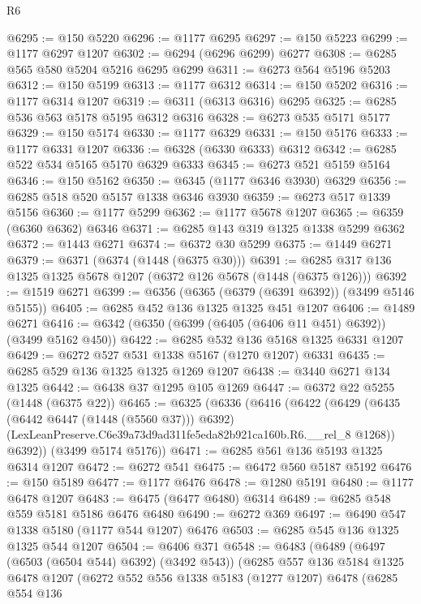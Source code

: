 \begin{lexlean}{R6}
\begin{coremodule}
@6295 := @150 @5220
@6296 := @1177 @6295
@6297 := @150 @5223
@6299 := @1177 @6297 @1207
@6302 := @6294 (@6296 @6299) @6277
@6308 := @6285 @565 @580 @5204 @5216 @6295 @6299
@6311 := @6273 @564 @5196 @5203
@6312 := @150 @5199
@6313 := @1177 @6312
@6314 := @150 @5202
@6316 := @1177 @6314 @1207
@6319 := @6311 (@6313 @6316) @6295
@6325 := @6285 @536 @563 @5178 @5195 @6312 @6316
@6328 := @6273 @535 @5171 @5177
@6329 := @150 @5174
@6330 := @1177 @6329
@6331 := @150 @5176
@6333 := @1177 @6331 @1207
@6336 := @6328 (@6330 @6333) @6312
@6342 := @6285 @522 @534 @5165 @5170 @6329 @6333
@6345 := @6273 @521 @5159 @5164
@6346 := @150 @5162
@6350 := @6345 (@1177 @6346 @3930) @6329
@6356 := @6285 @518 @520 @5157 @1338 @6346 @3930
@6359 := @6273 @517 @1339 @5156
@6360 := @1177 @5299
@6362 := @1177 @5678 @1207
@6365 := @6359 (@6360 @6362) @6346
@6371 := @6285 @143 @319 @1325 @1338 @5299 @6362
@6372 := @1443 @6271
@6374 := @6372 @30 @5299
@6375 := @1449 @6271
@6379 := @6371 (@6374 (@1448 (@6375 @30)))
@6391 := @6285 @317 @136 @1325 @1325 @5678 @1207 (@6372 @126 @5678 (@1448 (@6375 @126)))
@6392 := @1519 @6271
@6399 := @6356 (@6365 (@6379 (@6391 @6392)) (@3499 @5146 @5155))
@6405 := @6285 @452 @136 @1325 @1325 @451 @1207
@6406 := @1489 @6271
@6416 := @6342 (@6350 (@6399 (@6405 (@6406 @11 @451) @6392)) (@3499 @5162 @450))
@6422 := @6285 @532 @136 @5168 @1325 @6331 @1207
@6429 := @6272 @527 @531 @1338 @5167 (@1270 @1207) @6331
@6435 := @6285 @529 @136 @1325 @1325 @1269 @1207
@6438 := @3440 @6271 @134 @1325
@6442 := @6438 @37 @1295 @105 @1269
@6447 := @6372 @22 @5255 (@1448 (@6375 @22))
@6465 := @6325
    (@6336
      (@6416
        (@6422
          (@6429
            (@6435 (@6442 @6447 (@1448 (@5560 @37))) @6392)
            (LexLeanPreserve.C6e39a73d9ad311fe5eda82b921ca160b.R6.__rel_8 @1268))
          @6392))
      (@3499 @5174 @5176))
@6471 := @6285 @561 @136 @5193 @1325 @6314 @1207
@6472 := @6272 @541
@6475 := @6472 @560 @5187 @5192
@6476 := @150 @5189
@6477 := @1177 @6476
@6478 := @1280 @5191
@6480 := @1177 @6478 @1207
@6483 := @6475 (@6477 @6480) @6314
@6489 := @6285 @548 @559 @5181 @5186 @6476 @6480
@6490 := @6272 @369
@6497 := @6490 @547 @1338 @5180 (@1177 @544 @1207) @6476
@6503 := @6285 @545 @136 @1325 @1325 @544 @1207
@6504 := @6406 @371
@6548 := @6483
    (@6489
      (@6497 (@6503 (@6504 @544) @6392) (@3492 @543))
      (@6285
        @557
        @136
        @5184
        @1325
        @6478
        @1207
        (@6272
          @552
          @556
          @1338
          @5183
          (@1277 @1207)
          @6478
          (@6285
            @554
            @136

\end{coremodule}
\end{lexlean}
